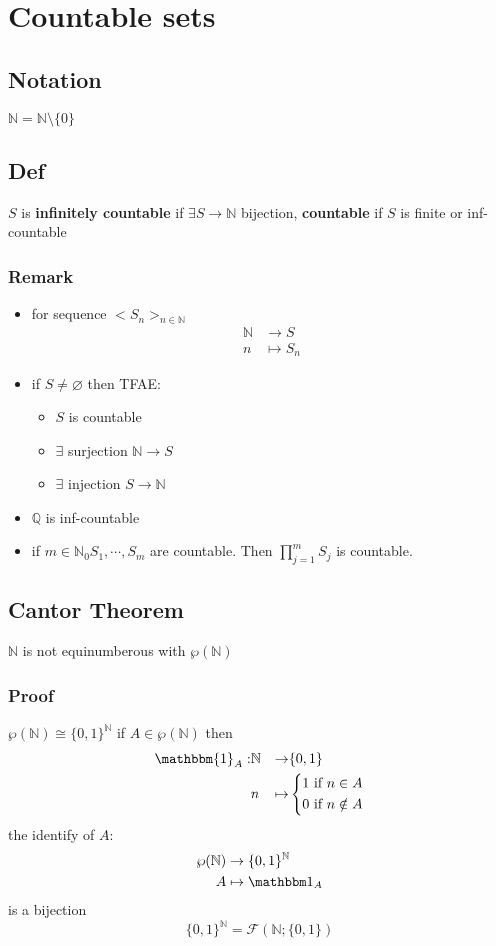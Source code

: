 \documentclass{book}
\begin{document}
\tableofcontents
\chapter{Countable sets}
\section{Notation}
$\mathbb N=\mathbb N\setminus \{0\}$
\section{Def}
$S$ is \textbf{infinitely countable} if $\exists S\rightarrow \mathbb N$ bijection, \textbf{countable} if $S$ is finite or inf-countable
\subsection*{Remark}
\begin{itemize}
    \item for sequence $<S_n>_{n\in \mathbb N}$$$\begin{aligned}
        \mathbb N &\rightarrow S\\ n&\mapsto S_n
    \end{aligned}$$
    \item if $S\neq \varnothing$ then TFAE:
    \begin{itemize}
        \item $S$ is countable
        \item $\exists$ surjection $\mathbb N\rightarrow S$
        \item $\exists$ injection $S\rightarrow \mathbb N$
    \end{itemize}
    \item $\mathbb Q$ is inf-countable
    \item if $m\in \mathbb N_0$$S_1,\cdots,S_m$ are countable. Then $\prod\limits_{j=1}^m S_j$ is countable.
\end{itemize}
\section{Cantor Theorem}$\mathbb N$ is not equinumberous with $\mathbb{\wp(\mathbb N)}$
\subsection*{Proof}
$\wp(\mathbb N)\cong \{0,1\}^{\mathbb N}$ if $A\in \wp(\mathbb N)$ then $$\begin{aligned}
    \mathbbm{1}_A:&\mathbb{N}&\rightarrow&\{0,1\}\\ & n&\mapsto &\left\{\begin{aligned}
        1&\text{ if }n\in A\\ 0&\text{ if }n\notin A
    \end{aligned}\right.
\end{aligned}$$
the identify of $A$:
$$\begin{aligned}
    \wp(\mathbb N) &\rightarrow\{0,1\}^{\mathbb{N}}\\A &\mapsto \mathbbm 1_A
\end{aligned}$$
is a bijection$$\{0,1\}^{\mathbb N}=\mathcal{F}(\mathbb N;\{0,1\})$$
\end{document}
